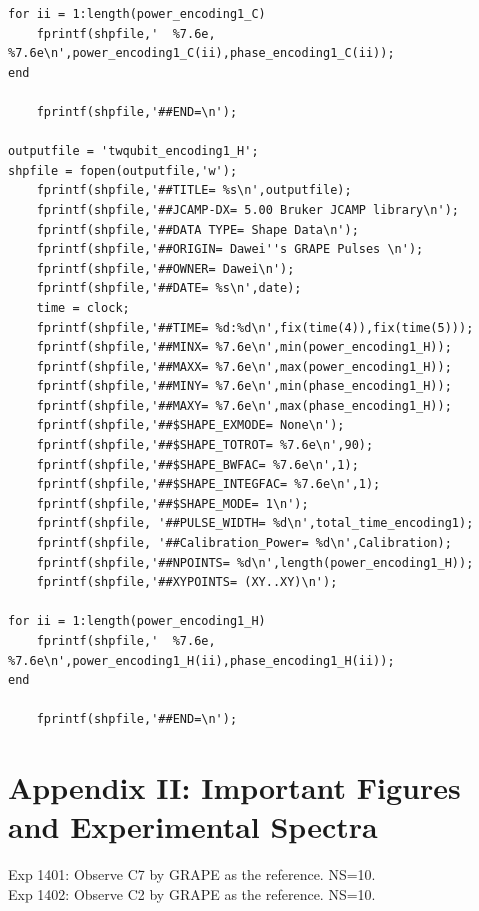 \begin{lstlisting}
for ii = 1:length(power_encoding1_C)
    fprintf(shpfile,'  %7.6e,  %7.6e\n',power_encoding1_C(ii),phase_encoding1_C(ii));
end

    fprintf(shpfile,'##END=\n');

outputfile = 'twqubit_encoding1_H';
shpfile = fopen(outputfile,'w');
    fprintf(shpfile,'##TITLE= %s\n',outputfile);
    fprintf(shpfile,'##JCAMP-DX= 5.00 Bruker JCAMP library\n');
    fprintf(shpfile,'##DATA TYPE= Shape Data\n');
    fprintf(shpfile,'##ORIGIN= Dawei''s GRAPE Pulses \n');
    fprintf(shpfile,'##OWNER= Dawei\n');
    fprintf(shpfile,'##DATE= %s\n',date);
    time = clock;
    fprintf(shpfile,'##TIME= %d:%d\n',fix(time(4)),fix(time(5)));
    fprintf(shpfile,'##MINX= %7.6e\n',min(power_encoding1_H));
    fprintf(shpfile,'##MAXX= %7.6e\n',max(power_encoding1_H));
    fprintf(shpfile,'##MINY= %7.6e\n',min(phase_encoding1_H));
    fprintf(shpfile,'##MAXY= %7.6e\n',max(phase_encoding1_H));
    fprintf(shpfile,'##$SHAPE_EXMODE= None\n');
    fprintf(shpfile,'##$SHAPE_TOTROT= %7.6e\n',90);
    fprintf(shpfile,'##$SHAPE_BWFAC= %7.6e\n',1);
    fprintf(shpfile,'##$SHAPE_INTEGFAC= %7.6e\n',1);
    fprintf(shpfile,'##$SHAPE_MODE= 1\n');
    fprintf(shpfile, '##PULSE_WIDTH= %d\n',total_time_encoding1);
    fprintf(shpfile, '##Calibration_Power= %d\n',Calibration);
    fprintf(shpfile,'##NPOINTS= %d\n',length(power_encoding1_H));
    fprintf(shpfile,'##XYPOINTS= (XY..XY)\n');

for ii = 1:length(power_encoding1_H)
    fprintf(shpfile,'  %7.6e,  %7.6e\n',power_encoding1_H(ii),phase_encoding1_H(ii));
end

    fprintf(shpfile,'##END=\n');
\end{lstlisting}

\clearpage
\section{Appendix II: Important Figures and Experimental Spectra}
Exp 1401: Observe C7 by GRAPE as the reference. NS=10.\\
Exp 1402: Observe C2 by GRAPE as the reference. NS=10. \\

